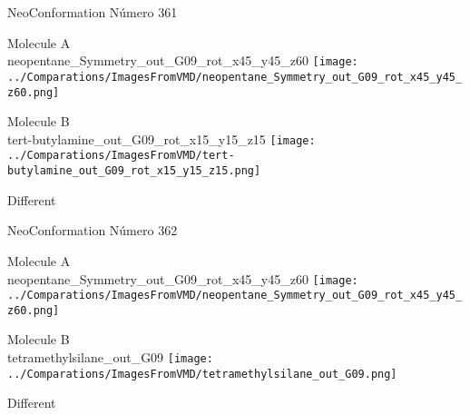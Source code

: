  \newpage

\vtab[-2cm]
\begin{center}
{\large NeoConformation \tab Número 361}
\end{center}
\begin{multicols}{2}
\begin{center}
Molecule A \\ 
neopentane\_Symmetry\_out\_G09\_rot\_x45\_y45\_z60
\texttt{[image: ../Comparations/ImagesFromVMD/neopentane\_Symmetry\_out\_G09\_rot\_x45\_y45\_z60.png]}
\\
\vtab

\columnbreak
Molecule B \\ 
tert-butylamine\_out\_G09\_rot\_x15\_y15\_z15
\texttt{[image: ../Comparations/ImagesFromVMD/tert-butylamine\_out\_G09\_rot\_x15\_y15\_z15.png]}
\\
\vtab


\end{center}
\end{multicols}
\begin{center}
\vtab
\vtab
\textcolor{NavyBlue}{\Large Different}
\end{center}

 \newpage

\vtab[-2cm]
\begin{center}
{\large NeoConformation \tab Número 362}
\end{center}
\begin{multicols}{2}
\begin{center}
Molecule A \\ 
neopentane\_Symmetry\_out\_G09\_rot\_x45\_y45\_z60
\texttt{[image: ../Comparations/ImagesFromVMD/neopentane\_Symmetry\_out\_G09\_rot\_x45\_y45\_z60.png]}
\\
\vtab

\columnbreak
Molecule B \\ 
tetramethylsilane\_out\_G09
\texttt{[image: ../Comparations/ImagesFromVMD/tetramethylsilane\_out\_G09.png]}
\\
\vtab


\end{center}
\end{multicols}
\begin{center}
\vtab
\vtab
\textcolor{NavyBlue}{\Large Different}
\end{center}

 \newpage

